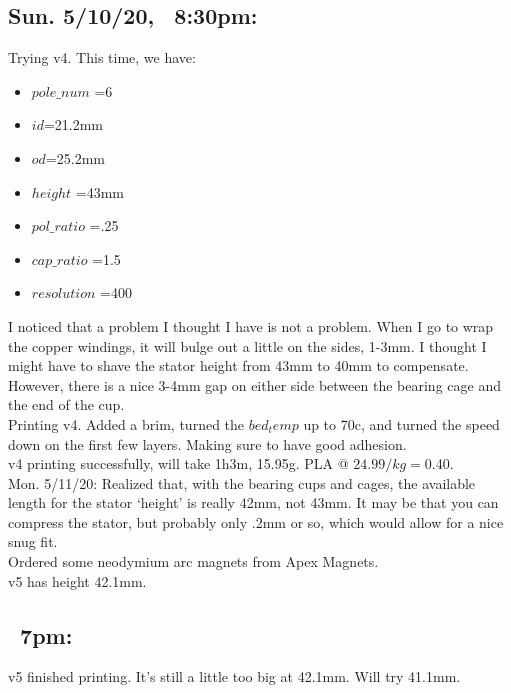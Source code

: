 \documentclass[11pt]{article} %
\begin{document}
\subsection*{Sun. 5/10/20, ~8:30pm:}

Trying v4. This time, we have:

\begin{itemize}
\item $pole\_num$ =6
\item $id$=21.2mm
\item $od$=25.2mm
\item $height$ =43mm
\item $pol\_ratio$ =.25
\item $cap\_ratio$ =1.5
\item $resolution$ =400
\end{itemize}

\noindent I noticed that a problem I thought I have is not a problem. When I go to wrap the copper windings, it will bulge out a little on the sides, 1-3mm. I thought I might have to shave the stator height from 43mm to 40mm to compensate. However, there is a nice 3-4mm gap on either side between the bearing cage and the end of the cup. \\

\noindent Printing v4. Added a brim, turned the $bed_temp$ up to 70c, and turned the speed down on the first few layers. Making sure to have good adhesion. \\

\noindent v4 printing successfully, will take 1h3m, 15.95g. PLA @ $24.99/kg = $0.40. \\

\noindent Mon. 5/11/20: Realized that, with the bearing cups and cages, the available length for the stator ‘height’ is really 42mm, not 43mm. It may be that you can compress the stator, but probably only .2mm or so, which would allow for a nice snug fit. \\

\noindent Ordered some neodymium arc magnets from Apex Magnets. \\

\noindent v5 has height 42.1mm. \\

\subsection*{~7pm:} v5 finished printing. It’s still a little too big at 42.1mm. Will try 41.1mm. \\
\end{document}

